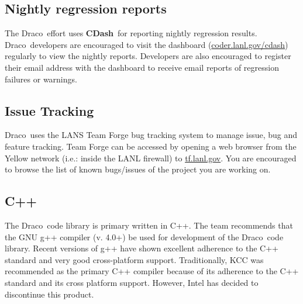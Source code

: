 \documentclass[11pt]{nmemo}
\newcommand{\draco}{{\normalfont\sffamily Draco}}
\newcommand{\cdash}{{\normalfont\bfseries CDash}}
\begin{document}
\subsection{Nightly regression reports}

The \draco\ effort uses \cdash\ for reporting nightly regression
results.  \draco\ developers are encouraged to visit the dashboard
(\url{coder.lanl.gov/cdash}) regularly to view the nightly reports.
Developers are also encouraged to register their email address with
the dashboard to receive email reports of regression failures or
warnings.

\subsection{Issue Tracking}

\draco\ uses the LANS Team Forge bug tracking system to manage issue,
bug and feature tracking.  Team Forge can be accessed by opening a web
browser from the Yellow network (i.e.: inside the LANL firewall) to
\url{tf.lanl.gov}.  You are encouraged to browse the list of known
bugs/issues of the project you are working on.



\subsection{C++}

The \draco\ code library is primary written in C++.  The team
recommends that the GNU g++ compiler (v. 4.0+) be used for development
of the \draco\ code library.  Recent versions of g++ have shown
excellent adherence to the C++ standard and very good cross-platform
support. Traditionally, KCC was recommended as the primary C++
compiler because of its adherence to the C++ standard and its cross
platform support.  However, Intel has decided to discontinue this
product.  
\end{document}
